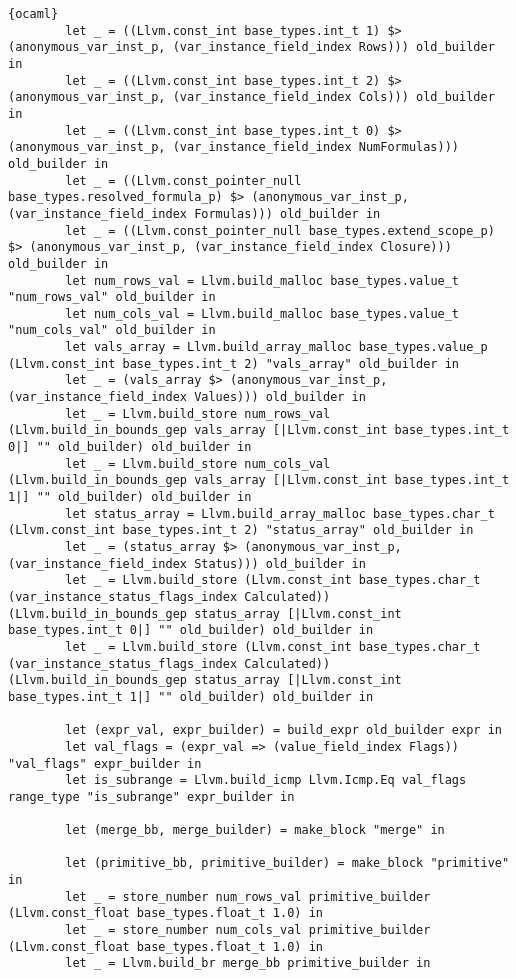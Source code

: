 \begin{lstlisting}{ocaml}
        let _ = ((Llvm.const_int base_types.int_t 1) $> (anonymous_var_inst_p, (var_instance_field_index Rows))) old_builder in
        let _ = ((Llvm.const_int base_types.int_t 2) $> (anonymous_var_inst_p, (var_instance_field_index Cols))) old_builder in
        let _ = ((Llvm.const_int base_types.int_t 0) $> (anonymous_var_inst_p, (var_instance_field_index NumFormulas))) old_builder in
        let _ = ((Llvm.const_pointer_null base_types.resolved_formula_p) $> (anonymous_var_inst_p, (var_instance_field_index Formulas))) old_builder in
        let _ = ((Llvm.const_pointer_null base_types.extend_scope_p) $> (anonymous_var_inst_p, (var_instance_field_index Closure))) old_builder in
        let num_rows_val = Llvm.build_malloc base_types.value_t "num_rows_val" old_builder in
        let num_cols_val = Llvm.build_malloc base_types.value_t "num_cols_val" old_builder in
        let vals_array = Llvm.build_array_malloc base_types.value_p (Llvm.const_int base_types.int_t 2) "vals_array" old_builder in
        let _ = (vals_array $> (anonymous_var_inst_p, (var_instance_field_index Values))) old_builder in
        let _ = Llvm.build_store num_rows_val (Llvm.build_in_bounds_gep vals_array [|Llvm.const_int base_types.int_t 0|] "" old_builder) old_builder in
        let _ = Llvm.build_store num_cols_val (Llvm.build_in_bounds_gep vals_array [|Llvm.const_int base_types.int_t 1|] "" old_builder) old_builder in
        let status_array = Llvm.build_array_malloc base_types.char_t (Llvm.const_int base_types.int_t 2) "status_array" old_builder in
        let _ = (status_array $> (anonymous_var_inst_p, (var_instance_field_index Status))) old_builder in
        let _ = Llvm.build_store (Llvm.const_int base_types.char_t (var_instance_status_flags_index Calculated)) (Llvm.build_in_bounds_gep status_array [|Llvm.const_int base_types.int_t 0|] "" old_builder) old_builder in
        let _ = Llvm.build_store (Llvm.const_int base_types.char_t (var_instance_status_flags_index Calculated)) (Llvm.build_in_bounds_gep status_array [|Llvm.const_int base_types.int_t 1|] "" old_builder) old_builder in

        let (expr_val, expr_builder) = build_expr old_builder expr in
        let val_flags = (expr_val => (value_field_index Flags)) "val_flags" expr_builder in
        let is_subrange = Llvm.build_icmp Llvm.Icmp.Eq val_flags range_type "is_subrange" expr_builder in

        let (merge_bb, merge_builder) = make_block "merge" in

        let (primitive_bb, primitive_builder) = make_block "primitive" in
        let _ = store_number num_rows_val primitive_builder (Llvm.const_float base_types.float_t 1.0) in
        let _ = store_number num_cols_val primitive_builder (Llvm.const_float base_types.float_t 1.0) in
        let _ = Llvm.build_br merge_bb primitive_builder in


\end{lstlisting}
